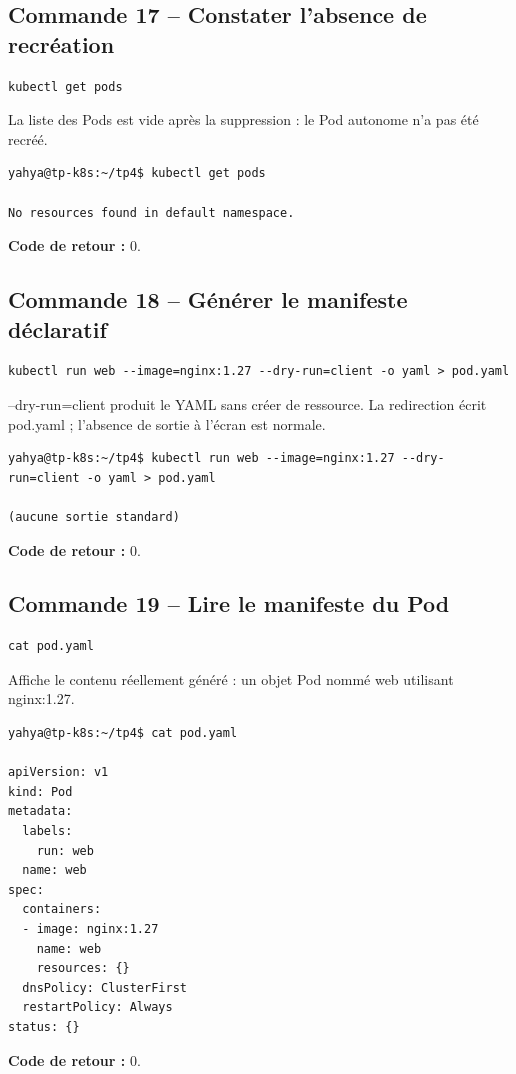 \documentclass[11pt,a4paper]{article}
\begin{document}
\subsection{Commande 17 -- Constater l’absence de recréation}
\begin{lstlisting}
kubectl get pods
\end{lstlisting}
La liste des Pods est vide après la suppression : le Pod autonome n’a pas été recréé.
\begin{tcolorbox}[terminal,title={Ubuntu / WSL2 -- Commande 17 -- rendu reconstitué}]
\begin{Verbatim}[fontsize=\scriptsize,breaklines=true,breakanywhere=true,breaksymbolleft={},breaksymbolright={}]
yahya@tp-k8s:~/tp4$ kubectl get pods

No resources found in default namespace.
\end{Verbatim}
\end{tcolorbox}
\textbf{Code de retour :} 0.

\subsection{Commande 18 -- Générer le manifeste déclaratif}
\begin{lstlisting}
kubectl run web --image=nginx:1.27 --dry-run=client -o yaml > pod.yaml
\end{lstlisting}
--dry-run=client produit le YAML sans créer de ressource. La redirection écrit pod.yaml ; l’absence de sortie à l’écran est normale.
\begin{tcolorbox}[terminal,title={Ubuntu / WSL2 -- Commande 18 -- rendu reconstitué}]
\begin{Verbatim}[fontsize=\scriptsize,breaklines=true,breakanywhere=true,breaksymbolleft={},breaksymbolright={}]
yahya@tp-k8s:~/tp4$ kubectl run web --image=nginx:1.27 --dry-run=client -o yaml > pod.yaml

(aucune sortie standard)
\end{Verbatim}
\end{tcolorbox}
\textbf{Code de retour :} 0.

\subsection{Commande 19 -- Lire le manifeste du Pod}
\begin{lstlisting}
cat pod.yaml
\end{lstlisting}
Affiche le contenu réellement généré : un objet Pod nommé web utilisant nginx:1.27.
\begin{tcolorbox}[terminal,title={Ubuntu / WSL2 -- Commande 19 -- rendu reconstitué}]
\begin{Verbatim}[fontsize=\scriptsize,breaklines=true,breakanywhere=true,breaksymbolleft={},breaksymbolright={}]
yahya@tp-k8s:~/tp4$ cat pod.yaml

apiVersion: v1
kind: Pod
metadata:
  labels:
    run: web
  name: web
spec:
  containers:
  - image: nginx:1.27
    name: web
    resources: {}
  dnsPolicy: ClusterFirst
  restartPolicy: Always
status: {}
\end{Verbatim}
\end{tcolorbox}
\textbf{Code de retour :} 0.
\end{document}
